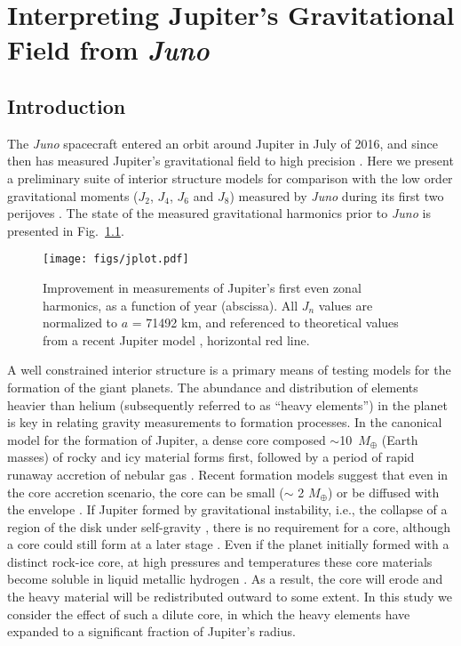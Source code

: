 \chapter{Interpreting Jupiter's Gravitational Field from \textit{Juno}}\label{chap8}

\section{Introduction} \label{sec:intro}

The \textit{Juno} spacecraft entered an orbit around Jupiter in July of 2016, and
since then has measured Jupiter's gravitational field to high precision
\citep{bolton2017}.  Here we present a preliminary suite of interior structure models
for comparison with the low order gravitational moments ($J_2$, $J_4$, $J_6$ and
$J_8$) measured by \textit{Juno} during its first two perijoves \citep{Folkner2017}.
The state of the measured gravitational harmonics prior to \textit{Juno} is presented
in Fig.~\ref{fig:jplot}.

\begin{figure}[h]
  \begin{center}
    \noindent\texttt{[image: figs/jplot.pdf]}
  \end{center}
\caption{Improvement in measurements of Jupiter's first even zonal harmonics, as a function of year
(abscissa).  All $J_n$ values are normalized to $a$ = 71492 km, and referenced to theoretical
values from a recent Jupiter model \citep{hubbard2016}, horizontal red line. }
\label{fig:jplot}
\end{figure}

A well constrained interior structure is  a primary means of testing models for
the formation of the giant planets. The abundance and distribution of elements
heavier than helium  (subsequently referred to as ``heavy elements'') in the
planet is key in relating gravity measurements to formation processes. In the
canonical model for the formation of Jupiter, a dense core composed
$\sim$10~$M_\oplus$ (Earth masses) of rocky and icy material forms first,
followed by a period of rapid runaway accretion of nebular gas
\citep{Mizuno1978,Bodenheimer1986,Pollack1996}. Recent formation models suggest
that even in the core accretion scenario, the core can be small ($\sim$ 2
$M_\oplus$) or be diffused with the envelope
\citep{venturini2016,lozovsky2017}. If Jupiter formed by gravitational
instability, i.e., the collapse of a region of the disk under self-gravity
\citep{Boss1997}, there is no requirement for a core, although a core could
still form at a later stage \citep{helled2014}.  Even if the planet initially
formed with a distinct rock-ice core, at high pressures and temperatures these
core materials become soluble in liquid metallic hydrogen
\citep{Stevenson1985,wilson2012a,Wilson2012b,Wahl2013,Gonzalez2013}. As a
result, the core will erode and the heavy material will be redistributed
outward to some extent. In this study we consider the effect of such a dilute
core, in which the heavy elements have expanded to a significant fraction of
Jupiter's radius.



